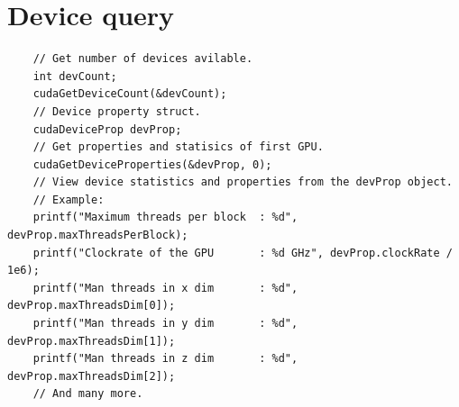\section{Device query}
\begin{verbatim}
    // Get number of devices avilable.
    int devCount;
    cudaGetDeviceCount(&devCount);
    // Device property struct.
    cudaDeviceProp devProp;
    // Get properties and statisics of first GPU.
    cudaGetDeviceProperties(&devProp, 0);
    // View device statistics and properties from the devProp object.
    // Example:
    printf("Maximum threads per block  : %d", devProp.maxThreadsPerBlock);
    printf("Clockrate of the GPU       : %d GHz", devProp.clockRate / 1e6);
    printf("Man threads in x dim       : %d", devProp.maxThreadsDim[0]);
    printf("Man threads in y dim       : %d", devProp.maxThreadsDim[1]);
    printf("Man threads in z dim       : %d", devProp.maxThreadsDim[2]);
    // And many more.

\end{verbatim}
\pagebreak
